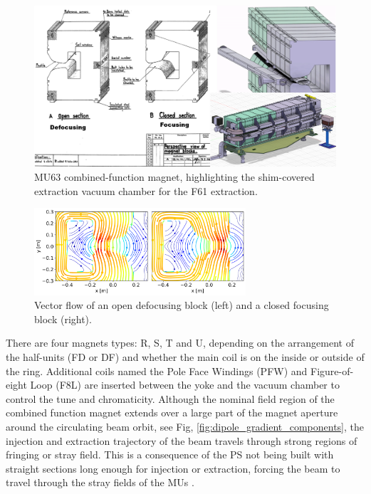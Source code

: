 \begin{figure}[H]
\centering
\includegraphics[width=1.0\textwidth]{01_Introduction/images/combined_function_magnets.png}
\caption{MU63 combined-function magnet, highlighting the shim-covered extraction vacuum chamber for the F61 extraction.}
\label{fig:combined_fuction_magnet}
\end{figure}

\begin{figure}[H]
\centering
\includegraphics[width=0.7\textwidth]{01_Introduction/images/vector_flow.png}
\caption{Vector flow of an open defocusing block (left) and a closed focusing block (right).}
\label{fig:vector_flow}
\end{figure}

There are four magnets types: R, S, T and U, depending on the arrangement of the half-units (FD or DF) and whether the main coil is on the inside or outside of the ring. Additional coils named the Pole Face Windings (PFW) and Figure-of-eight Loop (F8L) are inserted between the yoke and the vacuum chamber to control the tune and chromaticity. Although the nominal field region of the combined function
magnet extends over a large part of the magnet aperture around the circulating beam orbit, see Fig, \ref{fig:dipole_gradient_components}, the injection and extraction trajectory of the beam travels through strong regions of fringing or stray field. This is a consequence of the PS not being built with straight sections long enough for injection or extraction, forcing the beam to travel through the stray fields of the MUs \cite{risselada_beam_nodate, johnson_beam_2022}.
 
